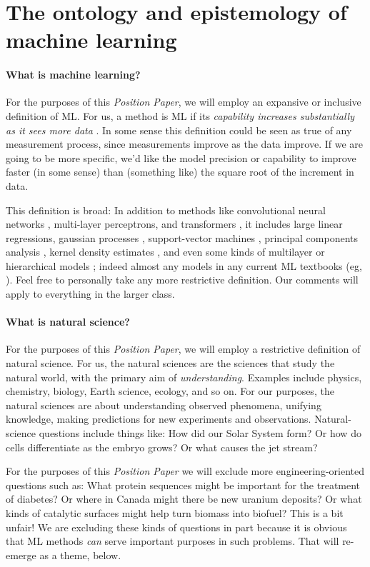 \documentclass[10pt]{article}
\newcommand{\documentname}{\textsl{Position Paper}}
\begin{document}
\section{The ontology and epistemology of machine learning}\label{sec:philosophy}

\paragraph{What is machine learning?}
For the purposes of this \documentname, we will employ an expansive or inclusive definition of ML.
For us, a method is ML if its \emph{capability increases substantially as it sees more data} \cite{ml_definition}.
In some sense this definition could be seen as true of any measurement process, since measurements improve as the data improve. 
If we are going to be more specific, we'd like the model precision or capability to improve faster (in some sense) than (something like) the square root of the increment in data.

This definition is broad:
In addition to methods like convolutional neural networks \cite{cnn}, multi-layer perceptrons, and transformers \cite{transformer}, it includes large linear regressions, gaussian processes \cite{gp}, support-vector machines \cite{svm}, principal components analysis \cite{pca}, kernel density estimates \cite{kde}, and even some kinds of multilayer or hierarchical models \cite{multilevel}; indeed almost any models in any current ML textbooks (eg, \citealt{ml_book1, ml_book2}).
Feel free to personally take any more restrictive definition.
Our comments will apply to everything in the larger class.

\paragraph{What is natural science?}
For the purposes of this \documentname, we will employ a restrictive definition of natural science.
For us, the natural sciences are the sciences that study the natural world, with the primary aim of \emph{understanding}.
Examples include physics, chemistry, biology, Earth science, ecology, and so on.
For our purposes, the natural sciences are about understanding observed phenomena, unifying knowledge, making predictions for new experiments and observations.
Natural-science questions include things like: How did our Solar System form? Or how do cells differentiate as the embryo grows? Or what causes the jet stream?

For the purposes of this \documentname{} we will exclude more engineering-oriented questions such as: What protein sequences might be important for the treatment of diabetes? Or where in Canada might there be new uranium deposits? Or what kinds of catalytic surfaces might help turn biomass into biofuel?
This is a bit unfair!
We are excluding these kinds of questions in part because it is obvious that ML methods \emph{can} serve important purposes in such problems.
That will re-emerge as a theme, below.
\end{document}

